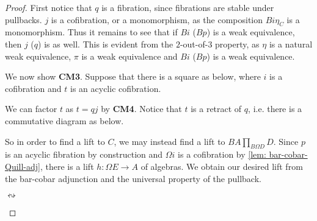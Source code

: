 \documentclass[../thesis.tex]{subfiles}
\begin{document}
\begin{proof}
                First notice that $q$ is a fibration, since fibrations are stable under pullbacks. $j$ is a cofibration, or a monomorphism, as the composition $Bi\eta_C$ is a monomorphism. Thus it remains to see that if $Bi$ ($Bp$) is a weak equivalence, then $j$ ($q$) is as well. This is evident from the $2$-out-of-$3$ property, as $\eta$ is a natural weak equivalence, $\pi$ is a weak equivalence and $Bi$ ($Bp$) is a weak equivalence.
                
                We now show \textbf{CM3}. Suppose that there is a square as below, where $i$ is a cofibration and $t$ is an acyclic cofibration.
                \begin{center}
                \end{center}
                
                We can factor $t$ as $t = qj$ by \textbf{CM4}. Notice that $t$ is a retract of $q$, i.e. there is a commutative diagram as below.
                \begin{center}
                \end{center}
                
                So in order to find a lift to $C$, we may instead find a lift to $BA\prod_{B\Omega D}D$. Since $p$ is an acyclic fibration by construction and $\Omega i$ is a cofibration by \ref{lem: bar-cobar-Quill-adj}, there is a lift $h: \Omega E \rightarrow A$ of algebras. We obtain our desired lift from the bar-cobar adjunction and the universal property of the pullback.
                \begin{center}
                     $\leftrightsquigarrow$
            \end{center}
        \end{proof}
\end{document}
